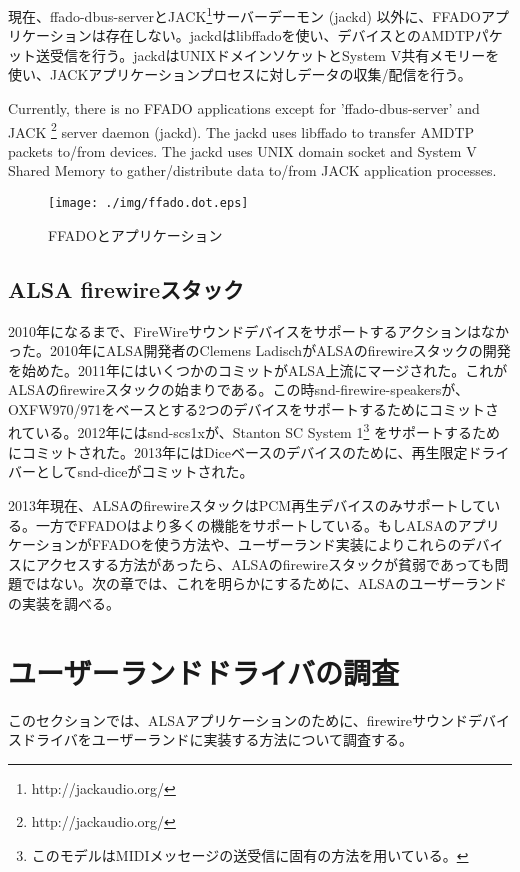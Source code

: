 \documentclass[onecolumn]{jarticle}
\begin{document}
現在、ffado-dbus-serverとJACK\footnote{http://jackaudio.org/}サーバーデーモン (jackd) 以外に、FFADOアプリケーションは存在しない。jackdはlibffadoを使い、デバイスとのAMDTPパケット送受信を行う。jackdはUNIXドメインソケットとSystem V共有メモリーを使い、JACKアプリケーションプロセスに対しデータの収集/配信を行う。

Currently, there is no FFADO applications except for 'ffado-dbus-server' and JACK \footnote{http://jackaudio.org/} server daemon (jackd). The jackd uses libffado to transfer AMDTP packets to/from devices. The jackd uses UNIX domain socket and System V Shared Memory to gather/distribute data to/from JACK application processes. 

\begin{figure}[H]
	\centering
	\texttt{[image: ./img/ffado.dot.eps]}
	\caption{{FFADOとアプリケーション}}
	\label{ffado_apps}
\end{figure}


\subsection{ALSA firewireスタック}

2010年になるまで、FireWireサウンドデバイスをサポートするアクションはなかった。2010年にALSA開発者のClemens LadischがALSAのfirewireスタックの開発を始めた。2011年にはいくつかのコミットがALSA上流にマージされた。これがALSAのfirewireスタックの始まりである。この時snd-firewire-speakersが、OXFW970/971をベースとする2つのデバイスをサポートするためにコミットされている。2012年にはsnd-scs1xが、Stanton SC System 1\footnote{このモデルはMIDIメッセージの送受信に固有の方法を用いている。} をサポートするためにコミットされた。2013年にはDiceベースのデバイスのために、再生限定ドライバーとしてsnd-diceがコミットされた。

2013年現在、ALSAのfirewireスタックはPCM再生デバイスのみサポートしている。一方でFFADOはより多くの機能をサポートしている。もしALSAのアプリケーションがFFADOを使う方法や、ユーザーランド実装によりこれらのデバイスにアクセスする方法があったら、ALSAのfirewireスタックが貧弱であっても問題ではない。次の章では、これを明らかにするために、ALSAのユーザーランドの実装を調べる。


\section{ユーザーランドドライバの調査}

このセクションでは、ALSAアプリケーションのために、firewireサウンドデバイスドライバをユーザーランドに実装する方法について調査する。
\end{document}
